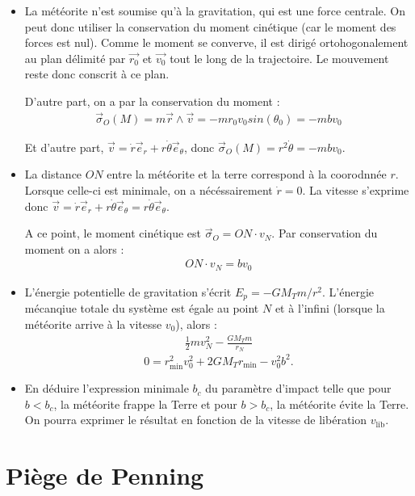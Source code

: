 \documentclass{report}
\begin{document}
\begin{itemize}
\item La météorite n'est soumise qu'à la gravitation, qui est une force centrale. On peut donc utiliser la conservation du moment cinétique (car le moment des forces est nul). Comme le moment se converve, il est dirigé ortohogonalement au plan délimité par $\vec{r_0}$ et $\vec{v_0}$ tout le long de la trajectoire. Le mouvement reste donc conscrit à ce plan.

D'autre part, on a par la conservation du moment :
\begin{align*}
	\vec{\sigma}_O(M)=m\vec{r}\wedge\vec{v}=-mr_0v_0sin(\theta_0)=-mbv_0
\end{align*}

Et d'autre part, $\vec{v}=\dot{r}\vec{e}_r+r\dot{\theta}\vec{e}_\theta$, donc $\vec{\sigma}_O(M)=r^2\dot{\theta}=-mbv_0$.


\item La distance $ON$ entre la météorite et la terre correspond à la coorodnnée $r$. Lorsque celle-ci est minimale, on a nécéssairement $\dot{r}=0$. La vitesse s'exprime donc $\vec{v}=\dot{r}\vec{e}_r+r\dot{\theta}\vec{e}_\theta=r\dot{\theta}\vec{e}_\theta$.

A ce point, le moment cinétique est $\vec{\sigma}_O=ON\cdot v_N$. Par conservation du moment on a alors :
\begin{align*}
	ON\cdot v_N=bv_0
\end{align*}

\item L'énergie potentielle de gravitation s'écrit $E_p=-GM_Tm/r^2$. L'énergie mécanqiue totale du système est égale au point $N$ et à l'infini (lorsque la météorite arrive à la vitesse $v_0$), alors :
\begin{align*}
	\frac{1}{2}mv_N^2-\frac{GM_Tm}{r_N}
\end{align*}
$$
0=r^2_\mathrm{min}v_0^2+2GM_Tr_\mathrm{min}-v_0^2b^2.
$$
\item En déduire l'expression minimale $b_c$ du paramètre d'impact telle que pour $b<b_c$, la météorite frappe la Terre et pour $b>b_c$, la météorite évite la Terre. On pourra exprimer le résultat en fonction de la vitesse de libération $v_\mathrm{lib}$.
\end{itemize}

\newpage

\section*{Piège de Penning}
\end{document}
